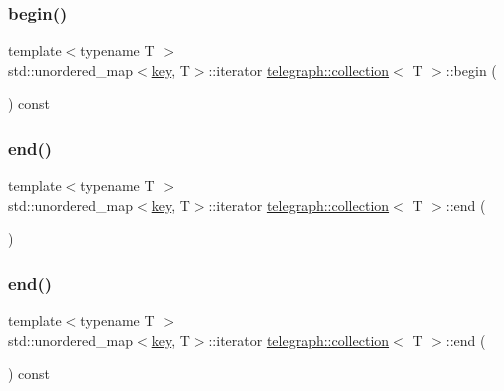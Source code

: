 \subsubsection{\texorpdfstring{begin()}{begin()}\hspace{0.1cm}{\footnotesize\ttfamily [2/2]}}
{\footnotesize\ttfamily template$<$typename T $>$ \\
std\+::unordered\+\_\+map$<$\hyperlink{classtelegraph_1_1collection_a7d1c05b1bdcbe95a3127122969e14173}{key}, T$>$\+::iterator \hyperlink{classtelegraph_1_1collection}{telegraph\+::collection}$<$ T $>$\+::begin (\begin{DoxyParamCaption}{ }\end{DoxyParamCaption}) const\hspace{0.3cm}{\ttfamily [inline]}}

\mbox{\label{classtelegraph_1_1collection_a14b2edf6043f717d568342a1a7575132}} 
\subsubsection{\texorpdfstring{end()}{end()}\hspace{0.1cm}{\footnotesize\ttfamily [1/2]}}
{\footnotesize\ttfamily template$<$typename T $>$ \\
std\+::unordered\+\_\+map$<$\hyperlink{classtelegraph_1_1collection_a7d1c05b1bdcbe95a3127122969e14173}{key}, T$>$\+::iterator \hyperlink{classtelegraph_1_1collection}{telegraph\+::collection}$<$ T $>$\+::end (\begin{DoxyParamCaption}{ }\end{DoxyParamCaption})\hspace{0.3cm}{\ttfamily [inline]}}

\mbox{\label{classtelegraph_1_1collection_ae8833bbd79ee1d4bc8c4d4c949fc4532}} 
\subsubsection{\texorpdfstring{end()}{end()}\hspace{0.1cm}{\footnotesize\ttfamily [2/2]}}
{\footnotesize\ttfamily template$<$typename T $>$ \\
std\+::unordered\+\_\+map$<$\hyperlink{classtelegraph_1_1collection_a7d1c05b1bdcbe95a3127122969e14173}{key}, T$>$\+::iterator \hyperlink{classtelegraph_1_1collection}{telegraph\+::collection}$<$ T $>$\+::end (\begin{DoxyParamCaption}{ }\end{DoxyParamCaption}) const\hspace{0.3cm}{\ttfamily [inline]}}

